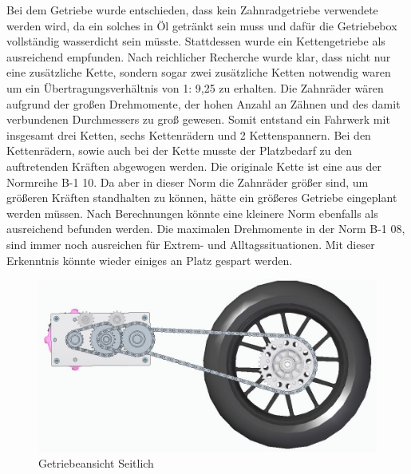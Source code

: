 Bei dem Getriebe wurde entschieden, dass kein Zahnradgetriebe verwendete werden wird, da ein solches in Öl getränkt sein muss und dafür die Getriebebox vollständig wasserdicht sein müsste. Stattdessen wurde ein Kettengetriebe als ausreichend empfunden. 
Nach reichlicher Recherche wurde klar, dass nicht nur eine zusätzliche Kette, sondern sogar zwei zusätzliche Ketten notwendig waren um ein Übertragungsverhältnis von 1: 9,25  zu erhalten. Die Zahnräder wären aufgrund der großen Drehmomente, der hohen Anzahl an Zähnen und des damit verbundenen Durchmessers zu groß gewesen. Somit entstand ein Fahrwerk mit insgesamt drei Ketten, sechs Kettenrädern und 2 Kettenspannern. 
Bei den Kettenrädern, sowie auch bei der Kette musste der Platzbedarf zu den auftretenden Kräften abgewogen werden. Die originale Kette ist eine aus der Normreihe B-1 10. Da aber in dieser Norm die Zahnräder größer sind, um größeren Kräften standhalten zu können, hätte ein größeres Getriebe eingeplant werden müssen. Nach Berechnungen könnte eine kleinere Norm ebenfalls als ausreichend befunden werden. Die maximalen Drehmomente in der Norm B-1 08, sind immer noch ausreichen für Extrem- und Alltagssituationen. Mit dieser Erkenntnis könnte wieder einiges an Platz gespart werden.

\newpage

\begin{figure} [H]
	\begin{center}
		\includegraphics[scale=0.5]{figures/mechanik/Getriebe.jpg}
			\caption{Getriebeansicht Seitlich}
			\label{fig:Getriebeansicht Seitlich}
	\end{center}
\end{figure}



